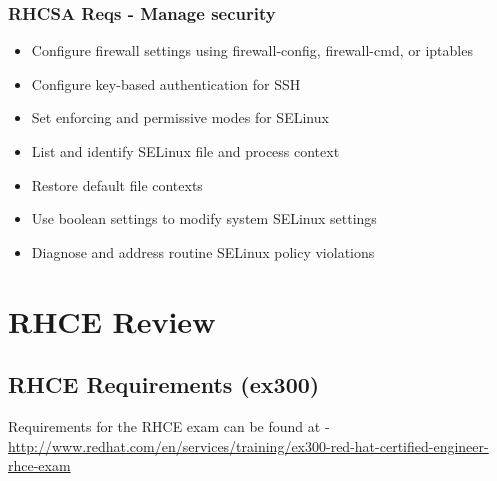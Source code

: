 \documentclass[letterpaper,10pt,english]{sphinxmanual}
\begin{document}
\subsection{RHCSA Reqs - Manage security}
\label{rhcsa:rhcsa-reqs-manage-security}\begin{itemize}
\item {} 
Configure firewall settings using firewall-config, firewall-cmd, or iptables

\item {} 
Configure key-based authentication for SSH

\item {} 
Set enforcing and permissive modes for SELinux

\item {} 
List and identify SELinux file and process context

\item {} 
Restore default file contexts

\item {} 
Use boolean settings to modify system SELinux settings

\item {} 
Diagnose and address routine SELinux policy violations

\end{itemize}


\chapter{RHCE Review}
\label{rhce:rhce-review}\label{rhce::doc}

\section{RHCE Requirements (ex300)}
\label{rhce:rhce-requirements-ex300}
Requirements for the RHCE exam can be found at -
\href{http://www.redhat.com/en/services/training/ex300-red-hat-certified-engineer-rhce-exam}{http://www.redhat.com/en/services/training/ex300-red-hat-certified-engineer-rhce-exam}
\end{document}

